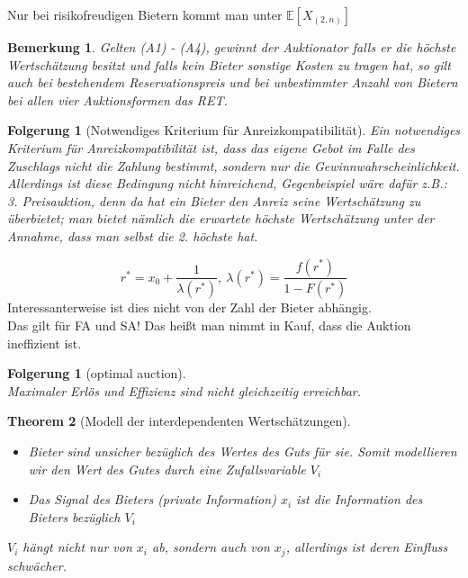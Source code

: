 \documentclass[12pt]{extreport} %
\theoremstyle{named}
\newtheorem{unnamedtheorem}{Theorem} \counterwithin{unnamedtheorem}{chapter}
\theoremstyle{nnamed}
\theoremstyle{itshape}
\theoremstyle{normal}
\newtheorem{folgerung}[unnamedtheorem]{Folgerung}
\newtheorem*{bemerkung}{Bemerkung}
\newtheorem*{folgerung*}{Folgerung}
\begin{document}
Nur bei risikofreudigen Bietern kommt man unter $\mathbb{E}\left[ X_{(2,n)} \right]$

\begin{bemerkung}
	Gelten (A1) - (A4), gewinnt der Auktionator falls er die höchste Wertschätzung besitzt und falls kein Bieter sonstige Kosten zu tragen hat, so gilt auch bei bestehendem Reservationspreis und bei unbestimmter Anzahl von Bietern bei allen vier Auktionsformen das RET.
\end{bemerkung}

\begin{folgerung*}[Notwendiges Kriterium für Anreizkompatibilität]
Ein notwendiges Kriterium für Anreizkompatibilität ist, dass das eigene Gebot im Falle des Zuschlags nicht die Zahlung bestimmt, sondern nur die Gewinnwahrscheinlichkeit. Allerdings ist diese Bedingung nicht hinreichend, Gegenbeispiel wäre dafür z.B.: 3. Preisauktion, denn da hat ein Bieter den Anreiz seine Wertschätzung zu überbietet; man bietet nämlich die erwartete höchste Wertschätzung unter der Annahme, dass man selbst die 2. höchste hat. 
\end{folgerung*}

$$ r^{*} = x_{0} + \frac{1}{\lambda(r^{*})}, ~ \lambda(r^{*}) = \frac{f(r^{*})}{1 - F(r^{*})} $$
Interessanterweise ist dies nicht von der Zahl der Bieter abhängig. ~\\

Das gilt für FA und SA! Das heißt man nimmt in Kauf, dass die Auktion ineffizient ist. ~\\

\begin{folgerung}[optimal auction] ~\\
	Maximaler Erlös und Effizienz sind nicht gleichzeitig erreichbar.
\end{folgerung}

\begin{unnamedtheorem}[Modell der interdependenten Wertschätzungen] ~\
	\begin{itemize}
		\item Bieter sind unsicher bezüglich des Wertes des Guts für sie. Somit modellieren wir den Wert des Gutes durch eine Zufallsvariable $V_{i}$
		\item Das Signal des Bieters (private Information) $x_{i}$ ist die Information des Bieters bezüglich $V_{i}$
	\end{itemize}
\textit{$V_{i}$ hängt nicht nur von $x_{i}$ ab, sondern auch von $x_{j}$, allerdings ist deren Einfluss schwächer.}
\end{unnamedtheorem}
\end{document}

